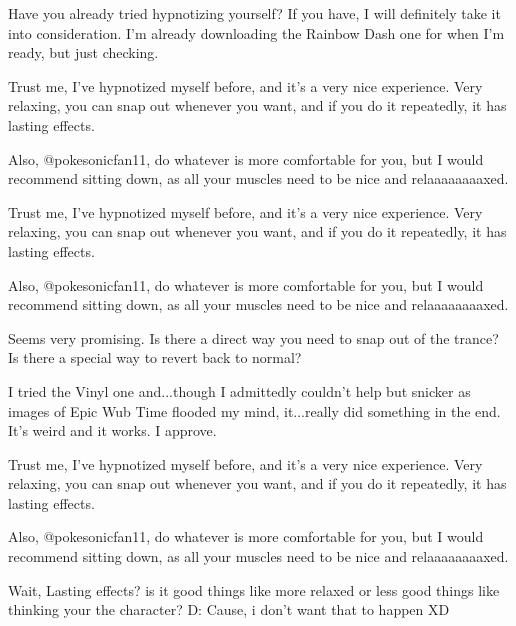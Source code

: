 \documentclass[ebook,12pt,oneside,openany]{memoir}
\begin{document}
\begin{tcolorbox}[title=Devvy \ding{170}Flutties\ding{170},colback=teal!5!white,colframe=teal!75!black,coltitle=white]
\begin{tcolorbox}[title=Opalicious]
\par{Have you already tried hypnotizing yourself? If you have, I will definitely take it into consideration. I'm already downloading the Rainbow Dash one for when I'm ready, but just checking.}
\end{tcolorbox}
\par{Trust me, I've hypnotized myself before, and it's a very nice experience. Very relaxing, you can snap out whenever you want, and if you do it repeatedly, it has lasting effects.}
\newline{}
\par{Also, @pokesonicfan11, do whatever is more comfortable for you, but I would recommend sitting down, as all your muscles need to be nice and relaaaaaaaaxed.}
\end{tcolorbox}
\begin{tcolorbox}[title=Opalicious,colback=violet!5!white,colframe=violet!75!black,coltitle=white]
\begin{tcolorbox}[title=Dev]
\par{Trust me, I've hypnotized myself before, and it's a very nice experience. Very relaxing, you can snap out whenever you want, and if you do it repeatedly, it has lasting effects.}
\newline{}
\par{Also, @pokesonicfan11, do whatever is more comfortable for you, but I would recommend sitting down, as all your muscles need to be nice and relaaaaaaaaxed.}
\end{tcolorbox}
\par{Seems very promising. Is there a direct way you need to snap out of the trance? Is there a special way to revert back to normal?}
\end{tcolorbox}
\begin{tcolorbox}[title=-BleachedOne-]
\par{\textcolor[HTML]{000080}{I tried the Vinyl one and...though I admittedly couldn't help but snicker as images of Epic Wub Time flooded my mind, it...really did something in the end. It's weird and it works. I approve.}}
\end{tcolorbox}
\begin{tcolorbox}[title=themildlyconfusedgamer]
\begin{tcolorbox}[title=Dev]
\par{Trust me, I've hypnotized myself before, and it's a very nice experience. Very relaxing, you can snap out whenever you want, and if you do it repeatedly, it has lasting effects.}
\newline{}
\par{Also, @pokesonicfan11, do whatever is more comfortable for you, but I would recommend sitting down, as all your muscles need to be nice and relaaaaaaaaxed.}
\end{tcolorbox}
\par{Wait, Lasting effects? is it good things like more relaxed or less good things like thinking your the character? D: Cause, i don't want that to happen XD }
\end{tcolorbox}
\end{document}
